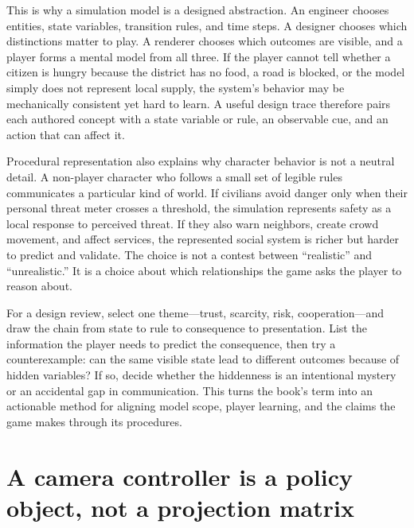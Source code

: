 This is why a simulation model is a designed abstraction. An engineer chooses entities, state variables, transition rules, and time steps. A designer chooses which distinctions matter to play. A renderer chooses which outcomes are visible, and a player forms a mental model from all three. If the player cannot tell whether a citizen is hungry because the district has no food, a road is blocked, or the model simply does not represent local supply, the system's behavior may be mechanically consistent yet hard to learn. A useful design trace therefore pairs each authored concept with a state variable or rule, an observable cue, and an action that can affect it.

Procedural representation also explains why character behavior is not a neutral detail. A non-player character who follows a small set of legible rules communicates a particular kind of world. If civilians avoid danger only when their personal threat meter crosses a threshold, the simulation represents safety as a local response to perceived threat. If they also warn neighbors, create crowd movement, and affect services, the represented social system is richer but harder to predict and validate. The choice is not a contest between ``realistic'' and ``unrealistic.'' It is a choice about which relationships the game asks the player to reason about.

For a design review, select one theme---trust, scarcity, risk, cooperation---and draw the chain from state to rule to consequence to presentation. List the information the player needs to predict the consequence, then try a counterexample: can the same visible state lead to different outcomes because of hidden variables? If so, decide whether the hiddenness is an intentional mystery or an accidental gap in communication. This turns the book's term into an actionable method for aligning model scope, player learning, and the claims the game makes through its procedures.

\section{A camera controller is a policy object, not a projection matrix}\label{06-engine-ii-ch046-a-camera-controller-is-a-policy-object-not-a-projection-matrix}

\hypertarget{06-engine-ii-ch046-a-camera-controller-is-a-policy-object-not-a-projection-matrix}{}

